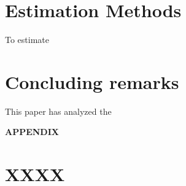 \documentclass[12pt]{article}
\begin{document}
\section{Estimation Methods} \label{estimation_methods}

To estimate 

\newpage
\section{Concluding remarks} \label{conclusions}

This paper has analyzed the 


\newpage





%






\newpage
























\appendix
\renewcommand{\thefigure}{A\arabic{figure}}
\renewcommand{\thetable}{A\arabic{table}}
\renewcommand{\theequation}{A\arabic{equation}}

\setcounter{figure}{0}
\setcounter{table}{0}

%


\newpage
{}
\recalctypearea

\newpage
\begin{center}
    \textbf{APPENDIX}
\end{center}

\section{XXXX}
\end{document}
